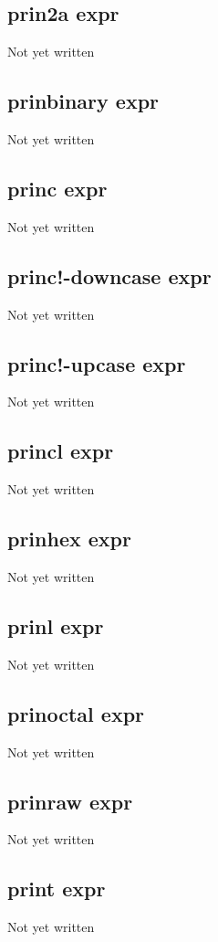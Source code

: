 \documentclass[a4paper,11pt]{article}
\begin{document}
{\subsection{\ttfamily prin2a expr}
   Not yet written

\subsection{\ttfamily prinbinary expr}
   Not yet written

\subsection{\ttfamily princ expr}
   Not yet written

\subsection{\ttfamily princ!-downcase expr}
   Not yet written

\subsection{\ttfamily princ!-upcase expr}
   Not yet written

\subsection{\ttfamily princl expr}
   Not yet written

\subsection{\ttfamily prinhex expr}
   Not yet written

\subsection{\ttfamily prinl expr}
   Not yet written

\subsection{\ttfamily prinoctal expr}
   Not yet written

\subsection{\ttfamily prinraw expr}
   Not yet written

\subsection{\ttfamily print expr}
   Not yet written

}
\end{document}
